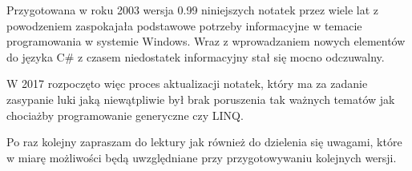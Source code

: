 Przygotowana w roku 2003 wersja 0.99 niniejszych notatek przez wiele lat z powodzeniem zaspokajała podstawowe
potrzeby informacyjne w temacie programowania w systemie Windows. Wraz z wprowadzaniem nowych elementów do języka C\#
z czasem niedostatek informacyjny stał się mocno odczuwalny. 

W 2017 rozpoczęto więc proces aktualizacji notatek, który 
ma za zadanie zasypanie luki jaką niewątpliwie był brak poruszenia tak ważnych tematów jak chociażby programowanie generyczne
czy LINQ. 

Po raz kolejny zapraszam do lektury jak również do dzielenia się uwagami, które w miarę możliwości będą uwzględniane
przy przygotowywaniu kolejnych wersji.